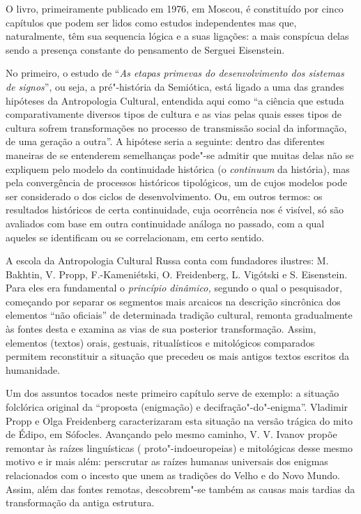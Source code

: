 O livro, primeiramente publicado em 1976, em Moscou, é constituído por
cinco capítulos que podem ser lidos como estudos independentes mas que,
naturalmente, têm sua sequencia lógica e a suas ligações: a mais
conspícua delas sendo a presença constante do pensamento de Serguei
Eisenstein.

No primeiro, o estudo de ``\emph{As etapas primevas do desenvolvimento
dos sistemas de signos}'', ou seja, a pré"-história da Semiótica, está
ligado a uma das grandes hipóteses da Antropologia Cultural, entendida
aqui como ``a ciência que estuda comparativamente diversos tipos de
cultura e as vias pelas quais esses tipos de cultura sofrem
transformações no processo de transmissão social da informação, de uma
geração a outra''. A hipótese seria a seguinte: dentro
das diferentes maneiras de se entenderem semelhanças pode"-se admitir que
muitas delas não se expliquem pelo modelo da continuidade histórica (o
\emph{continuum} da história), mas pela convergência de processos
históricos tipológicos, um de cujos modelos pode ser considerado o dos
ciclos de desenvolvimento. Ou, em outros termos: os resultados
históricos de certa continuidade, cuja ocorrência nos é visível, só são
avaliados com base em outra continuidade análoga no passado, com a qual
aqueles se identificam ou se correlacionam, em certo sentido.

A escola da Antropologia Cultural Russa conta com fundadores ilustres:
M. Bakhtin, V. Propp, F.-Kameniétski, O. Freidenberg, L. Vigótski e
S. Eisenstein. Para eles era fundamental o \emph{princípio dinâmico,}
segundo o qual o pesquisador, começando por separar os segmentos mais
arcaicos na descrição sincrônica dos elementos ``não oficiais'' de
determinada tradição cultural, remonta gradualmente às fontes desta e
examina as vias de sua posterior transformação. Assim, elementos
(textos) orais, gestuais, ritualísticos e mitológicos comparados
permitem reconstituir a situação que precedeu os mais antigos textos
escritos da humanidade.

Um dos assuntos tocados neste primeiro capítulo serve de exemplo: a
situação folclórica original da ``proposta (enigmação) e
decifração"-do"-enigma''. Vladimir Propp e Olga Freidenberg caracterizaram
esta situação na versão trágica do mito de Édipo, em Sófocles. Avançando
pelo mesmo caminho, V. V. Ivanov propõe remontar às raízes linguísticas (
proto"-indoeuropeias) e mitológicas desse mesmo motivo e ir mais além:
perscrutar as raízes humanas universais dos enigmas relacionados com o
incesto que unem as tradições do Velho e do Novo Mundo. Assim, além das
fontes remotas, descobrem"-se também as causas mais tardias da
transformação da antiga estrutura.

